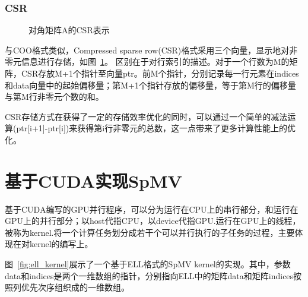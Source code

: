 \documentclass[11pt,twocolumn]{article}
\begin{document}
\subsubsection{CSR}
\begin{figure} 
  \centering 
  \hspace{3in} 
  \caption{对角矩阵A的CSR表示} 
  \label{fig:CSR} %
\end{figure}
与COO格式类似，Compressed sparse row(CSR)格式采用三个向量，显示地对非零元信息进行存储，如图~\ref{fig:CSR}。
区别在于对行索引的描述。对于一个行数为M的矩阵，CSR存放M+1个指针至向量ptr。前M个指针，分别记录每一行元素在indices和data向量中的起始偏移量；第M+1个指针存放的偏移量，等于第M行的偏移量与第M行非零元个数的和。

CSR存储方式在获得了一定的存储效率优化的同时，可以通过一个简单的减法运算(ptr[i+1]-ptr[i])来获得第i行非零元的总数，这一点带来了更多计算性能上的优化。
\section{基于CUDA实现SpMV}
基于CUDA编写的GPU并行程序，可以分为运行在CPU上的串行部分，和运行在GPU上的并行部分；以host代指CPU，以device代指GPU.运行在GPU上的线程，被称为kernel.将一个计算任务划分成若干个可以并行执行的子任务的过程，主要体现在对kernel的编写上。

图~\ref{fig:ell_kernel}展示了一个基于ELL格式的SpMV kernel的实现。其中，参数data和indices是两个一维数组的指针，分别指向ELL中的矩阵data和矩阵indices按照列优先次序组织成的一维数组。
\end{document}
